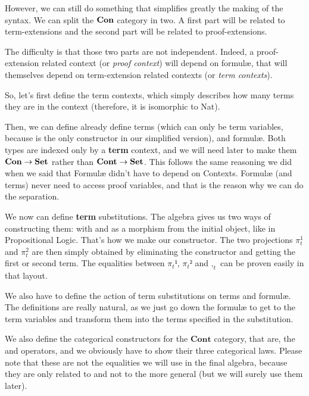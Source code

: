 \documentclass[10pt,a4paper]{article}
\begin{document}
			However, we can still do something that simplifies greatly the making of the syntax. We can split the $\textbf{Con}$ category in two. A first part will be related to term-extensions and the second part will be related to proof-extensions.
			
			The difficulty is that those two parts are not independent. Indeed, a proof-extension related context (or \emph{proof context}) will depend on formulæ, that will themselves depend on term-extension related contexts (or \emph{term contexts}).
		
			So, let's first define the term contexts, which simply describes how many terms they are in the context (therefore, it is isomorphic to Nat).
			
			\begin{tcolorbox}
			\end{tcolorbox}
		
			Then, we can define already define terms (which can only be term variables, because  is the only constructor in our simplified version), and formulæ. Both types are indexed only by a \textbf{term} context, and we will need later to make them $\textbf{Con} \rightarrow \textbf{Set}$ rather than $\textbf{Cont} \rightarrow \textbf{Set}$. This follows the same reasoning we did when we said that Formulæ didn't have to depend on Contexts. Formulæ (and terms) never need to access proof variables, and that is the reason why we can do the separation.
			
			\begin{tcolorbox}
				\agda{agda/FFOL-I-3.tex}
				\agdasep
				\agda{agda/FFOL-I-4.tex}
			\end{tcolorbox}
		
			We now can define \textbf{term} substitutions. The algebra gives us two ways of constructing them: with  and as a morphism from the initial object, like in Propositional Logic. That's how we make our constructor. The two projections $\pi_t^1$ and $\pi_t^2$ are then simply obtained by eliminating the  constructor and getting the first or second term. The equalities between $\pi_t¹$, $\pi_t²$ and $,_t$ can be proven easily in that layout.
			
			We also have to define the action of term substitutions on terms and formulæ. The definitions are really natural, as we just go down the formulæ to get to the term variables and transform them into the terms specified in the substitution.
			
			We also define the categorical constructors for the $\textbf{Cont}$ category, that are, the  and  operators, and we obviously have to show their three categorical laws. Please note that these are not the equalities we will use in the final algebra, because they are only related to  and not to the more general  (but we will surely use them later).
		
\end{document}
